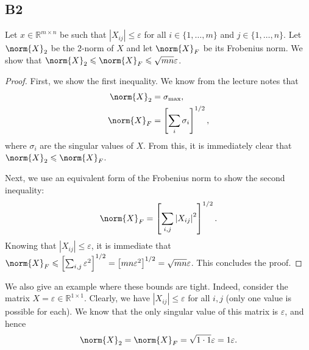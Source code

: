 \documentclass[11pt]{article}
\newcommand{\abs}[1]{\left\lvert#1\right\lvert}
\newcommand{\real}{\mathbb{R}} %
\newcommand{\snorm}[1]{\norm{#1}_2} %
\newcommand{\fnorm}[1]{\norm{#1}_F} %
\begin{document}
\subsection*{B2}
Let \(x \in \real^{m \times n}\) be such that \(\abs{X_{ij}} \leqslant \varepsilon\) for all \(i \in \{1, \dots, m\}\) and \(j \in \{1, \dots, n\}\).
Let \(\snorm{X}\) be the \(2\)-norm of \(X\) and let \(\fnorm{X}\) be its Frobenius norm.
We show that \(\snorm{X} \leqslant \fnorm{X} \leqslant \sqrt{mn} \varepsilon\).
\begin{proof}
	First, we show the first inequality.
	We know from the lecture notes that
	\begin{align*}
	\snorm{X} &= \sigma_{\textnormal{max}},\\
	\fnorm{X} &= \left[\sum_i \sigma_i\right]^{1/2},
	\end{align*}
	where \(\sigma_i\) are the singular values of \(X\).
	From this, it is immediately clear that \(\snorm{X} \leqslant \fnorm{X}\).
	
	Next, we use an equivalent form of the Frobenius norm to show the second inequality:
	\[
	\fnorm{X} = \left[\sum_{i, j} \abs{X_{ij}}^2 \right]^{1/2}.
	\]
	Knowing that \(\abs{X_{ij}} \leqslant \varepsilon\), it is immediate that \(\fnorm{X} \leqslant \left[\sum_{i, j} \varepsilon^2\right]^{1/2} = \left[mn \varepsilon^2\right]^{1/2} = \sqrt{mn} \varepsilon\).
	This concludes the proof.
\end{proof}

We also give an example where these bounds are tight.
Indeed, consider the matrix \(X = \varepsilon \in \real^{1 \times 1}\).
Clearly, we have \(\abs{X_{ij}} \leqslant \varepsilon \) for all \(i, j\) (only one value is possible for each).
We know that the only singular value of this matrix is \(\varepsilon\), and hence
\[
\snorm{X} = \fnorm{X} = \sqrt{1 \cdot 1} \varepsilon = 1 \varepsilon.
\]
\end{document}
